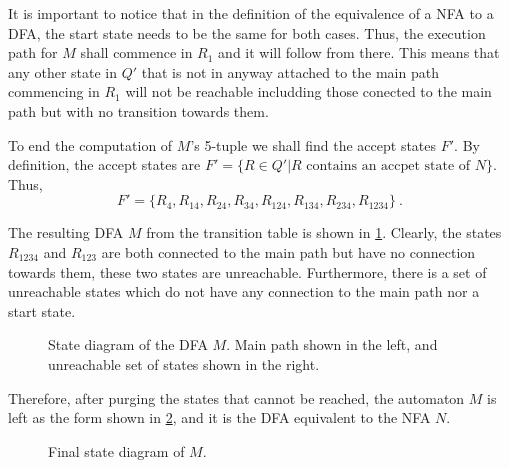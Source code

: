 \begin{solution}
    It is important to notice that in the definition of the equivalence of a NFA to a DFA, the start state needs to be the same for both cases. Thus, the execution path for $M$ shall commence in $R_1$ and it will follow from there. This means that any other state in $Q'$ that is not in anyway attached to the main path commencing in $R_1$ will not be reachable includding those conected to the main path but with no transition towards them.

    To end the computation of $M$'s 5-tuple we shall find the accept states $F'$. By definition, the accept states are $F' = \{R \in Q' | R \text{ contains an accpet state of } N\}$. Thus,
    \begin{equation*}
        F' = \{R_{4}, R_{14}, R_{24}, R_{34}, R_{124}, R_{134}, R_{234}, R_{1234}\}\ .
    \end{equation*}

    The resulting DFA $M$ from the transition table is shown in \cref{fig:det-automaton-general}. Clearly, the states $R_{1234}$ and $R_{123}$ are both connected to the main path but have no connection towards them, these two states are unreachable. Furthermore, there is a set of unreachable states which do not have any connection to the main path nor a start state.
    \begin{figure}[ht!]
        \centering
        
        
        \caption{State diagram of the DFA $M$. Main path shown in the left, and unreachable set of states shown in the right.}
        \label{fig:det-automaton-general}
    \end{figure}

    Therefore, after purging the states that cannot be reached, the automaton $M$ is left as the form shown in \cref{fig:det-automaton}, and it is the DFA equivalent to the NFA $N$.
    \begin{figure}[ht!]
        \centering
        
        \caption{Final state diagram of $M$.}
        \label{fig:det-automaton}
    \end{figure}
    
\end{solution}


